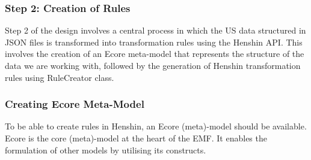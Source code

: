 \subsubsection*{Step 2: Creation of Rules}\label{design_step_2}
Step 2 of the design involves a central process in which the US data structured in JSON files is transformed into transformation rules using the Henshin API. This involves the creation of an Ecore meta-model that represents the structure of the data we are working with, followed by the generation of Henshin transformation rules using RuleCreator class.
\subsubsection*{Creating Ecore Meta-Model}\label{design_workflow_ecore}
To be able to create rules in Henshin, an Ecore (meta)-model should be available. Ecore is the core (meta)-model at the heart of the EMF. It enables the formulation of other models by utilising its constructs.

